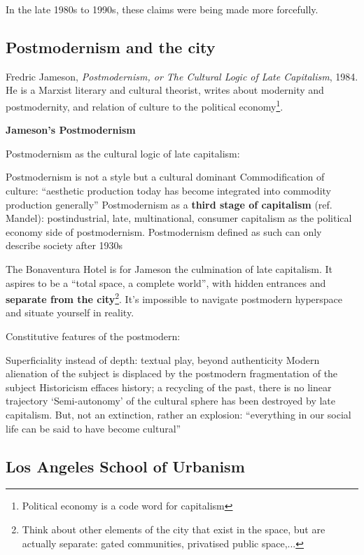 \documentclass{article}
\begin{document}
In the late 1980s to 1990s, these claims were being made more forcefully.

\subsection{Postmodernism and the city}

Fredric Jameson, \textit{Postmodernism, or The Cultural Logic of Late Capitalism}, 1984. He is a Marxist literary and cultural theorist, writes about modernity and postmodernity, and relation of culture to the political economy\footnote{Political economy is a code word for capitalism}.

\textbf{Jameson's Postmodernism}

Postmodernism as the cultural logic of late capitalism:
\begin{outline}
	\1 Postmodernism is not a style but a cultural dominant
	\1 Commodification of culture: ``aesthetic production today has become integrated into commodity production generally''
	\1 Postmodernism as a \textbf{third stage of capitalism} (ref. Mandel): postindustrial, late, multinational, consumer capitalism as the political economy side of postmodernism. Postmodernism defined as such can only describe society after 1930s
\end{outline}

The Bonaventura Hotel is for Jameson the culmination of late capitalism. It aspires to be a ``total space, a complete world'', with hidden entrances and \textbf{separate from the city}\footnote{Think about other elements of the city that exist in the space, but are actually separate: gated communities, privatised public space,...}. It's impossible to navigate postmodern hyperspace and situate yourself in reality.

Constitutive features of the postmodern:
\begin{outline}
	\1 Superficiality instead of depth: textual play, beyond authenticity
	\1 Modern alienation of the subject is displaced by the postmodern fragmentation of the subject
	\1 Historicism effaces history; a recycling of the past, there is no linear trajectory
	\1 `Semi-autonomy' of the cultural sphere has been destroyed by late capitalism. But, not an extinction, rather an explosion: ``everything in our social life can be said to have become cultural''
\end{outline}

\subsection{Los Angeles School of Urbanism}
\end{document}
